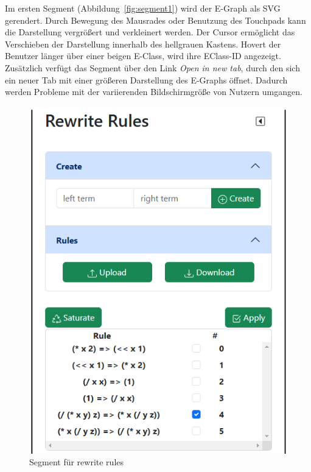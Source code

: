 Im ersten Segment (Abbildung~\ref{fig:segment1}) wird der E-Graph als SVG gerendert. Durch Bewegung des Mausrades oder Benutzung des Touchpads kann die Darstellung vergrößert und verkleinert werden.
Der Cursor ermöglicht das Verschieben der Darstellung innerhalb des hellgrauen Kastens. Hovert der Benutzer länger über einer beigen E-Class, wird ihre EClass-ID angezeigt.
Zusätzlich verfügt das Segment über den Link \textit{Open in new tab}, durch den
sich ein neuer Tab mit einer größeren Darstellung des E-Graphs öffnet. Dadurch werden Probleme mit der variierenden Bildschirmgröße von Nutzern umgangen.

\begin{figure}
    \vspace{-10mm}
    \begin{center}
      \includegraphics[scale=0.6]{../fig/rewriterulecontrol.png}
    \end{center}
    \caption{Segment für rewrite rules}
    \label{fig:segment2}
\end{figure}

